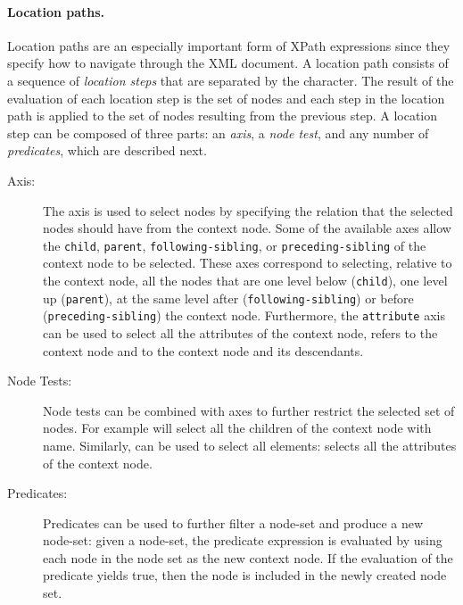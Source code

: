 \paragraph*{Location paths.} Location paths are an especially important form of \ac{XPath} expressions since they
specify how to navigate through the \ac{XML} document.  A location path consists of a sequence of \emph{location steps}
that are separated by the \character{/} character.
%
The result of the evaluation of each location step is the set of nodes and each step in the location path is applied to
the set of nodes resulting from the previous step.
% 
A location step can be composed of three parts: an \emph{axis}, a \emph{node test}, and any number of \emph{predicates},
which are described next.
%
\begin{description}
\item[Axis:] The axis is used to select nodes by specifying the relation that the selected nodes should have from the
  context node.
  Some of the available axes allow the \texttt{child}, \texttt{parent}, \texttt{following-sibling}, or
  \texttt{preceding-sibling} of the context node to be selected.  These axes correspond to selecting, relative to the
  context node, all the nodes that are one level below (\texttt{child}), one level up (\texttt{parent}), at the same
  level after (\texttt{following-sibling}) or before (\texttt{preceding-sibling}) the context node.
  Furthermore, the \texttt{attribute} axis can be used to select all the attributes of the context node,
   refers to the context node and  to the context node and its
  descendants.

\item[Node Tests:] Node tests can be combined with axes to further restrict the selected set of nodes.  For example
   will select all the children of the context node with  name.  Similarly,
  \character{*} can be used to select all elements:  selects all the attributes of the context
  node.
  
\item[Predicates:] Predicates can be used to further filter a node-set and produce a new node-set: given a node-set, the predicate
  expression is evaluated by using each node in the node set as the new context node.  If the evaluation of the predicate
  yields true, then the node is included in the newly created node set.
\end{description}

